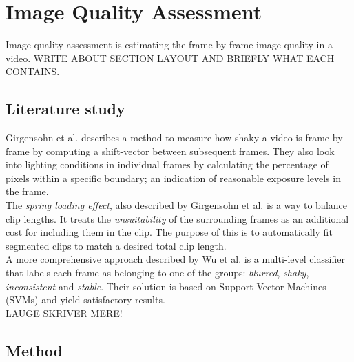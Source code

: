 %
\chapter{Image Quality Assessment}
%
Image quality assessment is estimating the frame-by-frame image quality in a video. WRITE ABOUT SECTION LAYOUT AND BRIEFLY WHAT EACH CONTAINS.%
%
\section{Literature study}
Girgensohn et al.\cite{Girgensohn:2000:SAH:354401.354415} describes a method to measure how shaky a video is frame-by-frame by computing a shift-vector between subsequent frames. They also look into lighting conditions in individual frames by calculating the percentage of pixels within a specific boundary; an indication of reasonable exposure levels in the frame.\\
The \textit{spring loading effect}\cite{Girgensohn:2000:SAH:354401.354415}, also described by Girgensohn et al. is a way to balance clip lengths. It treats the \textit{unsuitability} of the surrounding frames as an additional cost for including them in the clip. The purpose of this is to automatically fit segmented clips to match a desired total clip length.\\
%
A more comprehensive approach described by Wu et al.\cite{10.1109/ICME.2005.1521399} is a multi-level classifier that labels each frame as belonging to one of the groups: \textit{blurred}, \textit{shaky}, \textit{inconsistent} and \textit{stable}. Their solution is based on Support Vector Machines (SVMs) and yield satisfactory results.\\ %
LAUGE SKRIVER MERE!
%
\section{Method}
%
%
